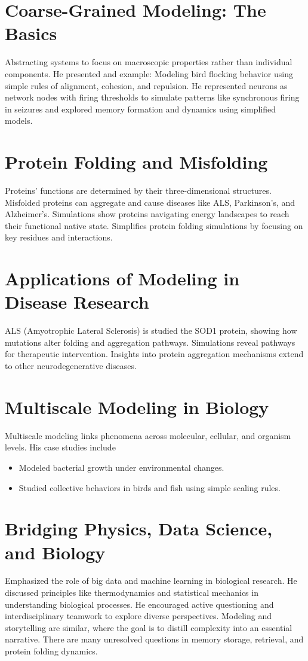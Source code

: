 \documentclass[12pt]{article}
\begin{document}
\section{Coarse-Grained Modeling: The Basics}
    Abstracting systems to focus on macroscopic properties rather than individual components. He presented and example: Modeling bird flocking behavior using simple rules of alignment, cohesion, and repulsion. He represented neurons as network nodes with firing thresholds to simulate patterns like synchronous firing in seizures and explored memory formation and dynamics using simplified models.


\section{Protein Folding and Misfolding}
    Proteins’ functions are determined by their three-dimensional structures. Misfolded proteins can aggregate and cause diseases like ALS, Parkinson’s, and Alzheimer’s. Simulations show proteins navigating energy landscapes to reach their functional native state. Simplifies protein folding simulations by focusing on key residues and interactions.


\section{Applications of Modeling in Disease Research}
    ALS (Amyotrophic Lateral Sclerosis) is studied the SOD1 protein, showing how mutations alter folding and aggregation pathways. Simulations reveal pathways for therapeutic intervention. Insights into protein aggregation mechanisms extend to other neurodegenerative diseases.


\section{Multiscale Modeling in Biology}
    Multiscale modeling links phenomena across molecular, cellular, and organism levels. His case studies include 
    \begin{itemize}
        \item Modeled bacterial growth under environmental changes.
        \item Studied collective behaviors in birds and fish using simple scaling rules.
    \end{itemize}

\section{Bridging Physics, Data Science, and Biology}
    Emphasized the role of big data and machine learning in biological research. He discussed principles like thermodynamics and statistical mechanics in understanding biological processes. He encouraged active questioning and interdisciplinary teamwork to explore diverse perspectives. Modeling and storytelling are similar, where the goal is to distill complexity into an essential narrative. There are many unresolved questions in memory storage, retrieval, and protein folding dynamics.
\end{document}
